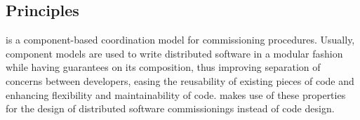 
\subsection{Principles}

\mad is a component-based coordination model for commissioning
procedures. Usually, component models are used to write
distributed software in a modular fashion while having guarantees on
its composition, thus improving separation of concerns between
developers, easing the reusability of existing pieces of code and
enhancing flexibility and maintainability of code. \mad makes use of
these properties for the design of distributed software commissionings
instead of code design.

